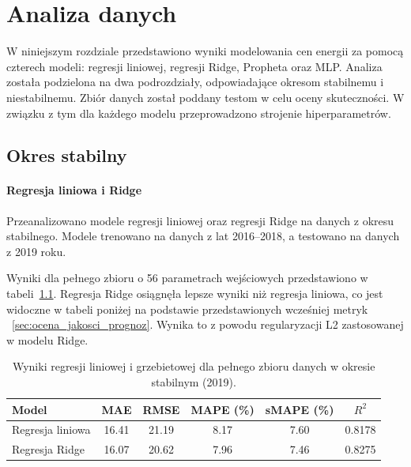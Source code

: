 \chapter{Analiza danych}
\label{ch:analiza}

W niniejszym rozdziale przedstawiono wyniki modelowania cen energii za pomocą czterech modeli: regresji liniowej, regresji Ridge, Propheta oraz MLP. Analiza została podzielona na dwa podrozdziały, odpowiadające okresom stabilnemu i niestabilnemu. Zbiór danych został poddany testom w celu oceny skuteczności. W związku z tym dla każdego modelu przeprowadzono strojenie hiperparametrów. 

\section{Okres stabilny}
\label{sec:okres_stabilny}

\subsubsection{Regresja liniowa i Ridge}

Przeanalizowano modele regresji liniowej oraz regresji Ridge na danych z okresu stabilnego. Modele trenowano na danych z lat 2016--2018, a testowano na danych z 2019 roku.

Wyniki dla pełnego zbioru o 56 parametrach wejściowych przedstawiono w tabeli~\ref{tab:linear_ridge_results_full}. Regresja Ridge osiągnęła lepsze wyniki niż regresja liniowa, co jest widoczne w tabeli poniżej na podstawie przedstawionych wcześniej metryk ~\ref{sec:ocena_jakosci_prognoz}. Wynika to z powodu regularyzacji L2 zastosowanej w modelu Ridge. 

\begin{table}[h]
    \centering
    \caption{Wyniki regresji liniowej i grzebietowej dla pełnego zbioru danych w okresie stabilnym (2019).}
    \label{tab:linear_ridge_results_full}
    \begin{tabular}{|l|ccccc|}
        \hline
        \textbf{Model} & \textbf{MAE} & \textbf{RMSE} & \textbf{MAPE (\%)} & \textbf{sMAPE (\%)} & \textbf{\(R^2\)} \\
        \hline
        Regresja liniowa & 16.41 & 21.19 & 8.17 & 7.60 & 0.8178 \\
        Regresja Ridge   & 16.07 & 20.62 & 7.96 & 7.46 & 0.8275 \\
        \hline
    \end{tabular}
\end{table}

